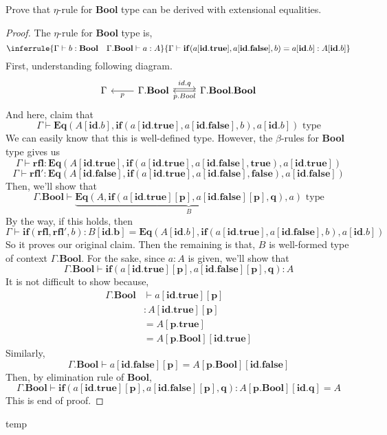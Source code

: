 \documentclass[12pt, a4paper, openany, twoside]{book}
\theoremstyle{definition}
\theoremstyle{remark}
\theoremstyle{plain}
\numberwithin{equation}{section}
\begin{document}
\begin{tcolorbox}[breakable, colback=yellow!10!white,colframe=brown!75!black,title=Exercise 4.1.2.]\hypertarget{Exer 4.1.2}{}
Prove that $\eta$-rule for \textbf{Bool} type can be derived with extensional equalities. 

\begin{proof}
The $\eta$-rule for \textbf{Bool} type is, 
\[
\inferrule
{
    \Gamma \vdash b : \mathbf{Bool} \quad \Gamma.\mathbf{Bool} \vdash a : A
}
{
    \Gamma \vdash \mathbf{if}(a[\mathbf{id.true}], a[\mathbf{id.false}], b) = a[\mathbf{id}.b] : A[\mathbf{id}.b]
}
\]
First, understanding following diagram. 
\[
\begin{tikzcd}
    \Gamma & \Gamma.\mathbf{Bool} \arrow[l, "p"] \arrow[r, shift left, "id.q"]& \Gamma.\mathbf{Bool.Bool} \arrow[l, "p.Bool"]
\end{tikzcd}
\]
And here, claim that 
\[\Gamma \vdash \mathbf{Eq}(A[\mathbf{id}.b], \mathbf{if}(a[\mathbf{id.true}], a[\mathbf{id.false}], b), a[\mathbf{id}.b]) \text{ type}\]
We can easily know that this is well-defined type. 
However, the $\beta$-rules for \textbf{Bool} type gives us 
\[\Gamma \vdash \mathbf{rfl} : \mathbf{Eq}(A[\mathbf{id.true}], \mathbf{if}(a[\mathbf{id.true}], a[\mathbf{id.false}], \mathbf{true}), a[\mathbf{id.true}])\]
\[\Gamma \vdash \mathbf{rfl'} : \mathbf{Eq}(A[\mathbf{id.false}], \mathbf{if}(a[\mathbf{id.true}], a[\mathbf{id.false}], \mathbf{false}), a[\mathbf{id.false}])\]
Then, we'll show that 
\[\Gamma.\mathbf{Bool} \vdash \underbrace{\mathbf{Eq}(A, \mathbf{if}(a[\mathbf{id.true}][\mathbf{p}], a[\mathbf{id.false}][\mathbf{p}], \mathbf{q}), a)}_{B} \text{ type}\]
By the way, if this holds, then 
\[\Gamma \vdash \mathbf{if}(\mathbf{rfl}, \mathbf{rfl'}, b) : B[\mathbf{id.b}] = \mathbf{Eq}(A[\mathbf{id}.b], \mathbf{if}(a[\mathbf{id.true}], a[\mathbf{id.false}], b), a[\mathbf{id}.b])\]
So it proves our original claim. Then the remaining is that, $B$ is well-formed type of context $\Gamma.\mathbf{Bool}$. 
For the sake, since $a : A$ is given, we'll show that 
\[\Gamma.\mathbf{Bool} \vdash \mathbf{if}(a[\mathbf{id.true}][\mathbf{p}], a[\mathbf{id.false}][\mathbf{p}], \mathbf{q}) : A\]
It is not difficult to show because, 
\begin{align*}
    \Gamma.\mathbf{Bool} & \vdash a[\mathbf{id.true}][\mathbf{p}] \\
    & : A[\mathbf{id.true}][\mathbf{p}] \\
    & = A[\mathbf{p.true}] \\
    & = A[\mathbf{p.Bool}][\mathbf{id.true}]
\end{align*}
Similarly, 
\[\Gamma.\mathbf{Bool} \vdash a[\mathbf{id.false}][\mathbf{p}] = A[\mathbf{p.Bool}][\mathbf{id.false}]\]
Then, by elimination rule of $\mathbf{Bool}$, 
\[\Gamma.\mathbf{Bool} \vdash \mathbf{if}(a[\mathbf{id.true}][\mathbf{p}], a[\mathbf{id.false}][\mathbf{p}], \mathbf{q}) : A[\mathbf{p.Bool}][\mathbf{id.q}] = A\]
This is end of proof. 
\end{proof}

\end{tcolorbox}

\newpage
temp 
\end{document}
